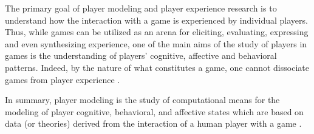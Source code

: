 The primary goal of player modeling and player experience research is to understand how the interaction with a game is experienced by individual players. Thus, while games can be utilized as an arena for eliciting, evaluating, expressing and even synthesizing experience, one of the main aims of the study of players in games is the understanding of players’ cognitive, affective and behavioral patterns. Indeed, by the nature of what constitutes a game, one cannot dissociate games from player experience \citep{YannakakisPlayerModeling2013}. \cite{MunozPlayPhysicsEmotionalGames2010}

In summary, player modeling is the study of computational means for the modeling of player cognitive, behavioral, and affective states which are based on data (or theories) derived from the interaction of a human player with a game \citep{YannakakisGameAIRevisited2012}.
